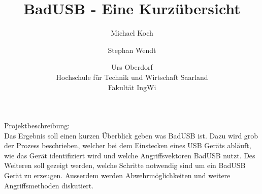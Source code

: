 \documentclass[ a4paper, 12pt, ]{article}
\title{BadUSB - Eine Kurzübersicht}
\author{Michael Koch \and{Stephan Wendt} \and{Urs Oberdorf}\\Hochschule für Technik und Wirtschaft Saarland\\Fakultät IngWi}
\date{} %
\begin{document}
\maketitle
Projektbeschreibung:\\
Das Ergebnis soll einen kurzen Überblick geben was BadUSB ist. Dazu wird grob der Prozess beschrieben,
welcher bei dem Einstecken eines USB Geräts abläuft, wie das Gerät identifiziert wird und welche 
Angriffsvektoren BadUSB nutzt. Des Weiteren soll gezeigt werden, welche Schritte notwendig sind um ein
BadUSB Gerät zu erzeugen. 
Ausserdem werden Abwehrmöglichkeiten und weitere Angriffsmethoden diskutiert.
\end{document}
